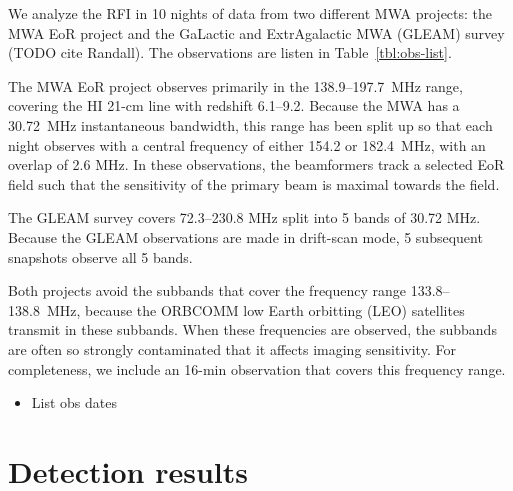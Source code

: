 \documentclass[useAMS,usenatbib]{mn2e}
\begin{document}
We analyze the RFI in 10 nights of data from two different MWA projects: the MWA EoR project \citep{bowman-science-with-the-mwa-2013} and the GaLactic and ExtrAgalactic MWA (GLEAM) survey (TODO cite Randall). The observations are listen in Table~\ref{tbl:obs-list}.

The MWA EoR project observes primarily in the 138.9--197.7~MHz range, covering the HI 21-cm line with redshift 6.1--9.2. Because the MWA has a 30.72~MHz instantaneous bandwidth, this range has been split up so that each night observes with a central frequency of either 154.2 or 182.4~MHz, with an overlap of 2.6 MHz. In these observations, the beamformers track a selected EoR field such that the sensitivity of the primary beam is maximal towards the field.

The GLEAM survey covers 72.3--230.8 MHz split into 5 bands of 30.72 MHz. Because the GLEAM observations are made in drift-scan mode, 5 subsequent snapshots observe all 5 bands.

Both projects avoid the subbands that cover the frequency range 133.8--138.8~MHz, because the ORBCOMM low Earth orbitting (LEO) satellites transmit in these subbands. When these frequencies are observed, the subbands are often so strongly contaminated that it affects imaging sensitivity. For completeness, we include an 16-min observation that covers this frequency range.

\begin{itemize}
 \item List obs dates
\end{itemize}

\section{Detection results}
\end{document}
